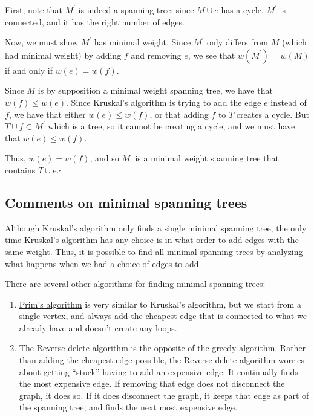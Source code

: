 \documentclass[]{article}
\providecommand{\tightlist}{%
  \setlength{\itemsep}{0pt}\setlength{\parskip}{0pt}}
\begin{document}
First, note that \(M^\prime\) is indeed a spanning tree; since
\(M\cup e\) has a cycle, \(M^\prime\) is connected, and it has the right
number of edges.

Now, we must show \(M^\prime\) has minimal weight. Since \(M^\prime\)
only differs from \(M\) (which had minimal weight) by adding \(f\) and
removing \(e\), we see that \(w(M^\prime)=w(M)\) if and only if
\(w(e)=w(f)\).

Since \(M\) is by supposition a minimal weight spanning tree, we have
that \(w(f)\leq w(e)\). Since Kruskal's algorithm is trying to add the
edge \(e\) instead of \(f\), we have that either \(w(e)\leq w(f)\), or
that adding \(f\) to \(T\) creates a cycle. But
\(T\cup f\subset M^\prime\) which is a tree, so it cannot be creating a
cycle, and we must have that \(w(e)\leq w(f)\).

Thus, \(w(e)=w(f)\), and so \(M^\prime\) is a minimal weight spanning
tree that contains \(T\cup e.  \square\)

\subsection{Comments on minimal spanning
trees}\label{comments-on-minimal-spanning-trees}

Although Kruskal's algorithm only finds a single minimal spanning tree,
the only time Kruskal's algorithm has any choice is in what order to add
edges with the same weight. Thus, it is possible to find all minimal
spanning trees by analyzing what happens when we had a choice of edges
to add.

There are several other algorithms for finding minimal spanning trees:

\begin{enumerate}
\def\labelenumi{\arabic{enumi}.}
\tightlist
\item
  \href{https://en.wikipedia.org/wiki/Prim\%27s_algorithm}{Prim's
  algorithm} is very similar to Kruskal's algorithm, but we start from a
  single vertex, and always add the cheapest edge that is connected to
  what we already have and doesn't create any loops.
\item
  The
  \href{https://en.wikipedia.org/wiki/Reverse-delete_algorithm}{Reverse-delete
  algorithm} is the opposite of the greedy algorithm. Rather than adding
  the cheapest edge possible, the Reverse-delete algorithm worries about
  getting ``stuck'' having to add an expensive edge. It continually
  finds the most expensive edge. If removing that edge does not
  disconnect the graph, it does so. If it does disconnect the graph, it
  keeps that edge as part of the spanning tree, and finds the next most
  expensive edge.
\end{enumerate}
\end{document}
